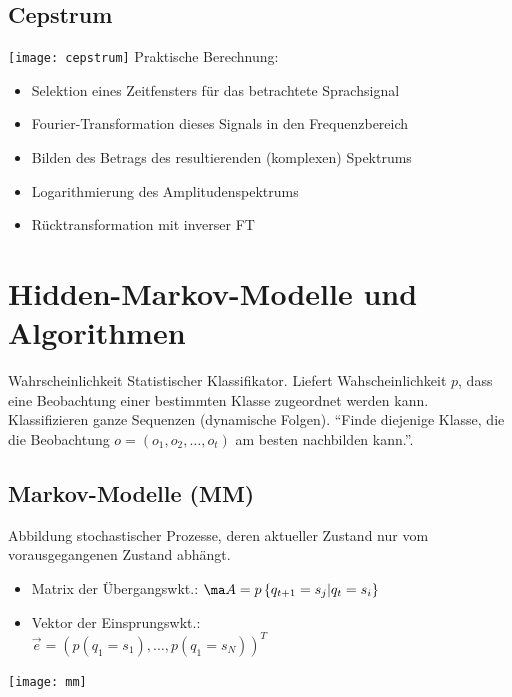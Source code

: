 \documentclass[german,color,6pt]{latex4ei/latex4ei_sheet}
\begin{document}
\begin{sectionbox}
	\subsection{Cepstrum}
	\texttt{[image: cepstrum]}
	Praktische Berechnung:
	\begin{itemize}
		\item Selektion eines Zeitfensters für das betrachtete Sprachsignal
		\item Fourier-Transformation dieses Signals in den Frequenzbereich
		\item Bilden des Betrags des resultierenden (komplexen) Spektrums
		\item Logarithmierung des Amplitudenspektrums
		\item Rücktransformation mit inverser FT
	\end{itemize}

\end{sectionbox}

\columnbreak

\section{Hidden-Markov-Modelle und Algorithmen}
\begin{symbolbox}Wahrscheinlichkeit
Statistischer Klassifikator. Liefert Wahscheinlichkeit $p$, dass eine Beobachtung einer bestimmten Klasse zugeordnet werden kann. Klassifizieren ganze Sequenzen (dynamische Folgen). "`Finde diejenige Klasse, die die Beobachtung $o=(o_1, o_2, \dots , o_t)$ am besten nachbilden kann."'.
\end{symbolbox}

\begin{sectionbox}
	\subsection{Markov-Modelle (MM)}
	Abbildung stochastischer Prozesse, deren aktueller Zustand nur vom vorausgegangenen Zustand abhängt.
	\begin{itemize}
		\item Matrix der Übergangswkt.: $\ma A = p \left\{ q_{t+1} = s_j | q_t = s_i \right\}$
		\item Vektor der Einsprungswkt.: \\ $\vec e = (p(q_1 = s_1), \dots , p(q_1 = s_N))^T$
	\end{itemize}
	\texttt{[image: mm]}
\end{sectionbox}
\end{document}
